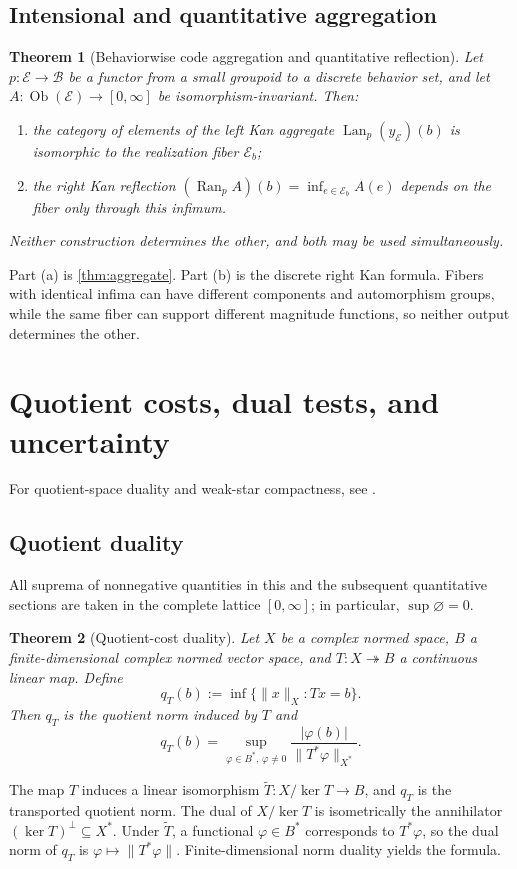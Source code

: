 \documentclass[12pt,a4paper,twoside]{extarticle}
\makeatletter
\theoremstyle{compactplain}
\newtheorem{theorem}{Theorem}[section]
\theoremstyle{compactdef}
\renewenvironment{proof}[1][\proofname]{\par\pushQED{\qed}\normalfont
  \topsep2pt\trivlist\item[\hskip\labelsep\bfseries #1\@addpunct{.}]\ignorespaces}
 {\popQED\endtrivlist\@endpefalse}
\newcommand{\Lan}{\operatorname{Lan}}
\newcommand{\Ran}{\operatorname{Ran}}
\newcommand{\onto}{\twoheadrightarrow}
\makeatother
\begin{document}
\subsection{Intensional and quantitative aggregation}
\begin{theorem}[Behaviorwise code aggregation and quantitative reflection]\label{thm:two-aggregations}
Let $p:\mathcal E\to\mathcal B$ be a functor from a small groupoid to a discrete behavior set, and let $A:\operatorname{Ob}(\mathcal E)\to[0,\infty]$ be isomorphism-invariant.  Then:
\begin{enumerate}[label=(\alph*)]
\item the category of elements of the left Kan aggregate $\Lan_p(y_{\mathcal E})(b)$ is isomorphic to the realization fiber $\mathcal E_b$;
\item the right Kan reflection $(\Ran_pA)(b)=\inf_{e\in\mathcal E_b}A(e)$ depends on the fiber only through this infimum.
\end{enumerate}
Neither construction determines the other, and both may be used simultaneously.
\end{theorem}
\begin{proof}
Part (a) is \cref{thm:aggregate}.  Part (b) is the discrete right Kan formula.  Fibers with identical infima can have different components and automorphism groups, while the same fiber can support different magnitude functions, so neither output determines the other.
\end{proof}

\section{Quotient costs, dual tests, and uncertainty}\label{sec:quotient-duality}
For quotient-space duality and weak-star compactness, see \cite{conway,folland}.

\subsection{Quotient duality}
All suprema of nonnegative quantities in this and the subsequent quantitative sections are taken in the complete lattice $[0,\infty]$; in particular, $\sup\varnothing=0$.
\begin{theorem}[Quotient-cost duality]\label{thm:quotient-duality}
Let $X$ be a complex normed space, $B$ a finite-dimensional complex normed vector space, and $T:X\onto B$ a continuous linear map.  Define
\[
  q_T(b):=\inf\{\|x\|_X:Tx=b\}.
\]
Then $q_T$ is the quotient norm induced by $T$ and
\[
  q_T(b)=\sup_{\varphi\in B^*,\,\varphi\ne0}
  \frac{|\varphi(b)|}{\|T^*\varphi\|_{X^*}}.
\]
\end{theorem}
\begin{proof}
The map $T$ induces a linear isomorphism $\widetilde T:X/\ker T\to B$, and $q_T$ is the transported quotient norm.  The dual of $X/\ker T$ is isometrically the annihilator $(\ker T)^\perp\subseteq X^*$.  Under $\widetilde T$, a functional $\varphi\in B^*$ corresponds to $T^*\varphi$, so the dual norm of $q_T$ is $\varphi\mapsto\|T^*\varphi\|$.  Finite-dimensional norm duality yields the formula.
\end{proof}
\end{document}
